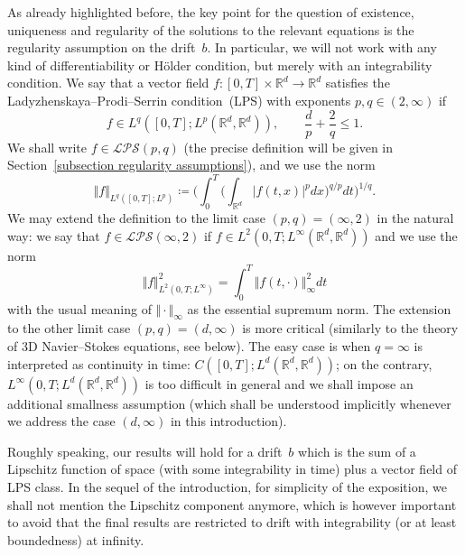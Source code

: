 \documentclass[a4paper,10pt]{article}
\newcommand\1{\mathbbm{1}}
\numberwithin{equation}{section}
\begin{document}
As already highlighted before, the key point for the question of existence, uniqueness and regularity of the solutions to the relevant equations is the regularity assumption on the drift~$b$. In particular, we will not work with any kind of differentiability or H\"{o}lder condition, but merely with an integrability condition. 
We say that a vector field $f \colon [ 0,T] \times\mathbb{R}^{d}\rightarrow\mathbb{R}^{d}$ satisfies the Ladyzhenskaya--Prodi--Serrin condition~(LPS) with exponents $p,q\in(2,\infty)$ if
\begin{equation*}
f\in L^{q}([0,T];L^{p}(\mathbb{R}^{d},\mathbb{R}^{d})),\qquad\frac{d}{p}+\frac{2}{q}\leq1.
\end{equation*}
We shall write $f\in\mathcal{LPS}(p,q)$ (the precise definition will be given in Section~\ref{subsection regularity assumptions}), and we use the norm
\begin{equation*}
\Vert f \Vert_{L^{q}([0,T];L^{p})} \coloneqq \bigg(\int_{0}^{T}\Big(\int_{\mathbb{R}^{d}} \vert f(t,x)
\vert^{p} dx \Big)^{q/p} dt \bigg)^{1/q}.
\end{equation*}
We may extend the definition to the limit case $(p,q) =(\infty,2)$ in the natural way: we say that $f\in\mathcal{LPS}(\infty,2)$ if $f\in L^{2}(0,T;L^{\infty}(\mathbb{R}^{d}, \mathbb{R}^{d}) )$ and we use the norm 
\begin{equation*}
\Vert f \Vert_{L^{2}(0,T;L^{\infty})
}^{2}= \int_{0}^{T} \Vert f(t,\cdot) \Vert_{\infty}^{2} dt
\end{equation*}
with the usual meaning of $\Vert \cdot \Vert _{\infty}$ as the essential supremum norm. The extension to the other limit case $(p,q) =(d,\infty)$ is more critical (similarly to the theory of 3D Navier--Stokes equations, see below). The easy case is when $q=\infty$ is interpreted as continuity in time: $C([0,T];L^{d}(\mathbb{R}^{d},\mathbb{R}^{d}))$; on the contrary, $L^{\infty}(0,T;L^{d}(\mathbb{R}^{d},\mathbb{R}^{d}) )$ is too difficult in general and we shall impose an additional smallness assumption (which shall be understood implicitly whenever we address the case $(d,\infty)$ in this introduction).

Roughly speaking, our results will hold for a drift~$b$ which is the sum of a Lipschitz function of space (with some integrability in time) plus a vector field of LPS class. In the sequel of the introduction, for simplicity of the exposition, we shall not mention the Lipschitz component anymore, which is however important to avoid that the final results are restricted to drift with integrability (or at least boundedness) at infinity.
\end{document}
